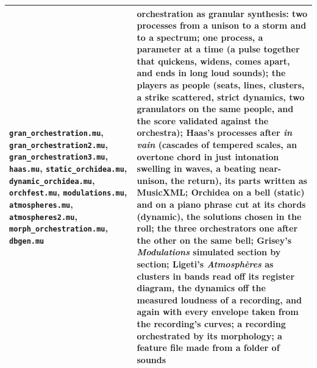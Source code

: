 \documentclass[11pt,a4paper]{article}
\begin{document}
\begin{center}
\begin{tabular}{@{}ll@{}}
\texttt{gran\_orchestration.mu}, \texttt{gran\_orchestration2.mu}, \texttt{gran\_orchestration3.mu}, \texttt{haas.mu}, \texttt{static\_orchidea.mu}, \texttt{dynamic\_orchidea.mu}, \texttt{orchfest.mu}, \texttt{modulations.mu}, \texttt{atmospheres.mu}, \texttt{atmospheres2.mu}, \texttt{morph\_orchestration.mu}, \texttt{dbgen.mu} & orchestration as granular synthesis: two processes from a unison to a storm and to a spectrum; one process, a parameter at a time (a pulse together that quickens, widens, comes apart, and ends in long loud sounds); the players as people (seats, lines, clusters, a strike scattered, strict dynamics, two granulators on the same people, and the score validated against the orchestra); Haas's processes after \emph{in vain} (cascades of tempered scales, an overtone chord in just intonation swelling in waves, a beating near-unison, the return), its parts written as MusicXML; Orchidea on a bell (static) and on a piano phrase cut at its chords (dynamic), the solutions chosen in the roll; the three orchestrators one after the other on the same bell; Grisey's \emph{Modulations} simulated section by section; Ligeti's \emph{Atmosphères} as clusters in bands read off its register diagram, the dynamics off the measured loudness of a recording, and again with every envelope taken from the recording's curves; a recording orchestrated by its morphology; a feature file made from a folder of sounds \\
\bottomrule
\end{tabular}
\end{center}
\end{document}
